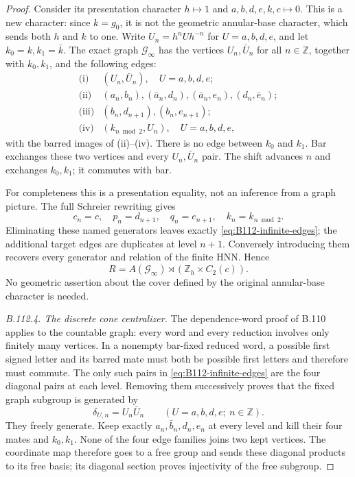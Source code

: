 \begin{proof}
Consider its presentation character $h\mapsto1$ and
$a,b,d,e,k,c\mapsto0$. This is a new character: since $k=g_0$,
it is not the geometric annular-base character, which sends both
$h$ and $k$ to one. Write $U_n=h^nUh^{-n}$ for
$U=a,b,d,e$, and let $k_0=k,k_1=\bar k$. The exact graph
$\mathcal G_\infty$ has the vertices $U_n,\bar U_n$ for all
$n\in\mathbb Z$, together with $k_0,k_1$, and the following edges:
\begin{equation}\label{eq:B112-infinite-edges}
 \begin{array}{ll}
 \text{(i)}&(U_n,\bar U_n),\quad U=a,b,d,e;\\
 \text{(ii)}&(a_n,b_n),(\bar a_n,d_n),(\bar a_n,e_n),(d_n,\bar e_n);\\
 \text{(iii)}&(b_n,d_{n+1}),(b_n,e_{n+1});\\
 \text{(iv)}&(k_{n\bmod2},U_n),\quad U=a,b,d,e,
 \end{array}
\end{equation}
with the barred images of (ii)--(iv). There is no edge between
$k_0$ and $k_1$. Bar exchanges these two vertices and every
$U_n,\bar U_n$ pair. The shift advances $n$ and exchanges
$k_0,k_1$; it commutes with bar.

For completeness this is a presentation equality, not an inference
from a graph picture. The full Schreier rewriting gives
\[
 c_n=c,\quad p_n=d_{n+1},\quad q_n=e_{n+1},\quad
 k_n=k_{n\bmod2}.
\]
Eliminating these named generators leaves exactly
\eqref{eq:B112-infinite-edges}; the additional target edges are
duplicates at level $n+1$. Conversely introducing them recovers
every generator and relation of the finite HNN. Hence
\begin{equation}\label{eq:B112-unfold}
 R=A(\mathcal G_\infty)\rtimes
                (\mathbb Z_h\times C_2(c)).
\end{equation}
No geometric assertion about the cover defined by the original
annular-base character is needed.

\emph{B.112.4. The discrete cone centralizer.}
The dependence-word proof of B.110 applies to the countable graph:
every word and every reduction involves only finitely many vertices.
In a nonempty bar-fixed reduced word, a possible first signed letter
and its barred mate must both be possible first letters and therefore
must commute. The only such pairs in
\eqref{eq:B112-infinite-edges} are the four diagonal pairs at each
level. Removing them successively proves that the fixed graph
subgroup is generated by
\[
 \delta_{U,n}=U_n\bar U_n\qquad(U=a,b,d,e;\ n\in\mathbb Z).
\]
They freely generate. Keep exactly
$a_n,\bar b_n,d_n,e_n$ at every level and kill their four mates
and $k_0,k_1$. None of the four edge families joins two kept
vertices. The coordinate map therefore goes to a free group and
sends these diagonal products to its free basis; its diagonal section
proves injectivity of the free subgroup.


\end{proof}
